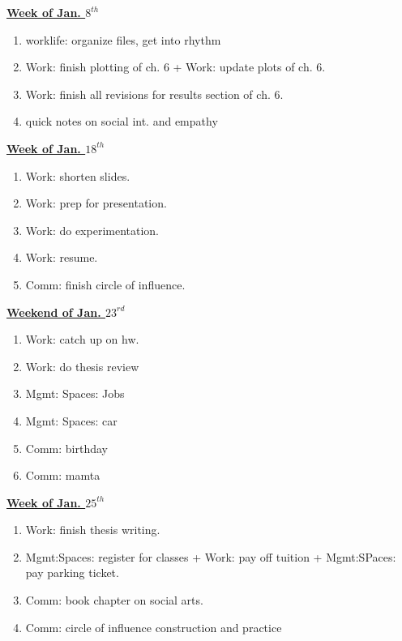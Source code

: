 \documentclass[11pt]{article}
\begin{document}
           {\small \underline{\textbf{Week of Jan. $8^{th}$}}}\\
           \begin{enumerate}
             \small \item \small worklife: organize files, get into rhythm
             \small \item \small Work: finish plotting of ch. 6 +
             Work: update plots of ch. 6. 
             \small \item \small Work: finish all revisions for
             results section of ch. 6. 
             \item \small quick notes on social int. and empathy 
           \end{enumerate}
           
           {\small \underline{\textbf{Week of Jan. $18^{th}$}} }\\
           \begin{enumerate} 
             \small \item \small Work: shorten slides. 
           \item \small Work: prep for presentation. 
             
           \item \small Work: do experimentation. 
           \item \small Work: resume. 
           \item \small Comm: finish circle of influence. 
           \end{enumerate} 
                   
            {\small \underline{\textbf{Weekend of Jan. $23^{rd}$}} }\\
           \begin{enumerate} 
             \item \small Work: catch up on hw. 
             \item \small Work: do thesis review
             \item \small Mgmt: Spaces: Jobs 
             \item \small Mgmt: Spaces: car 
             \item \small Comm: birthday  
             \item \small Comm: mamta
               
           \end{enumerate}

           {\small \underline{\textbf{Week of Jan. $25^{th}$}} }\\
           \begin{enumerate} 
             \small \item \small Work: finish thesis writing. 
           \item \small Mgmt:Spaces: register for classes + Work: pay off tuition  +  Mgmt:SPaces: pay parking ticket.
           \item \small Comm: book chapter on social arts. 
           \item \small Comm: circle of influence construction and practice 
           \end{enumerate}
           
\end{document}
